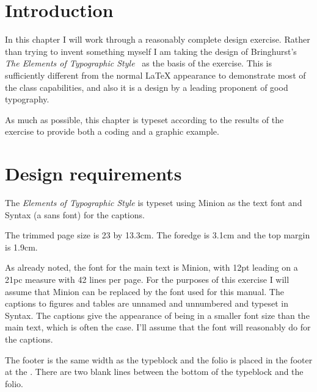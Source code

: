 
\section{Introduction}

    In this chapter I will work through a reasonably complete design
exercise. Rather than trying to invent something myself I am taking the design
of Bringhurst's 
\textit{The Elements of Typographic Style}~\cite{BRINGHURST99}
as the basis of the
exercise. This is sufficiently different from the normal LaTeX appearance
to demonstrate most of the class capabilities, and also it is a design by
a leading proponent of good typography.

    As much as possible, this chapter is typeset according to the results
of the exercise to provide both a coding and a graphic example.

\section{Design requirements}

    The \textit{Elements of Typographic Style} is typeset using 
Minion as the text font and Syntax 
(a sans font) 
for the captions. 

    The trimmed page size is 23 by 13.3cm. The foredge is 3.1cm and the
top margin is 1.9cm.

    As already noted, the font for the main text is Minion, 
with 12pt leading
on a 21pc measure with 42 lines per page. For the purposes of this exercise
I will assume that Minion can be replaced by the font used for this
manual. The captions to figures and tables are 
unnamed and 
unnumbered and typeset in Syntax. The captions give the 
appearance of being
in a smaller font size than the main text, which is often the case. I'll
assume that the \cmd{\small}\cmd{\sfseries} font will reasonably do for the
captions. 

    The footer is the same width as the 
typeblock and the folio is placed 
in the footer at the \foredge. There are two blank lines between 
the bottom of the typeblock and the folio.

